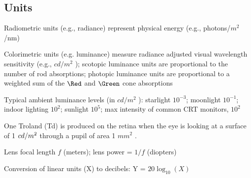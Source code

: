 


\newcommand{\cdmsquared}{\mbox{$ cd / m^2$} }
\newcommand{\mm}{\mbox{$mm$} }
\newcommand{\squaremm}{\mbox{$mm^2$} }
\newcommand{\cubicmm}{\mbox{$mm^3$} }
\newcommand{\squaredeg}{\mbox{$deg^2$} }


\singlespace
\vspace{1.6in}

\subsection*{Units}

\be
\item Radiometric units (e.g., radiance) represent physical energy
(e.g., photons/${m^2}$/nm) 

\item Colorimetric units (e.g. luminance) measure radiance adjusted
visual wavelength sensitivity (e.g., \cdmsquared); scotopic luminance
units are proportional to the number of rod absorptions;  photopic
luminance units are proportional to a weighted sum of the $\Red$ and
$\Green$ cone absorptions

\item Typical ambient luminance levels (in \cdmsquared):
starlight $ 10^{-3}$; moonlight $  10^{-1}$; indoor
lighting $ 10^2$; sunlight $ 10^5$; max intensity of
common CRT monitors, $10^2$

\item One Troland (Td) is produced on the retina when the eye is looking at a
surface of 1 $\cdmsquared$ through a pupil of area 1 \squaremm.


\item Lens focal length $f$ (meters); lens power = $1/f$ (diopters)

\item  Conversion of linear units (X) to decibels: Y = $20 \log_{10} (X)$

